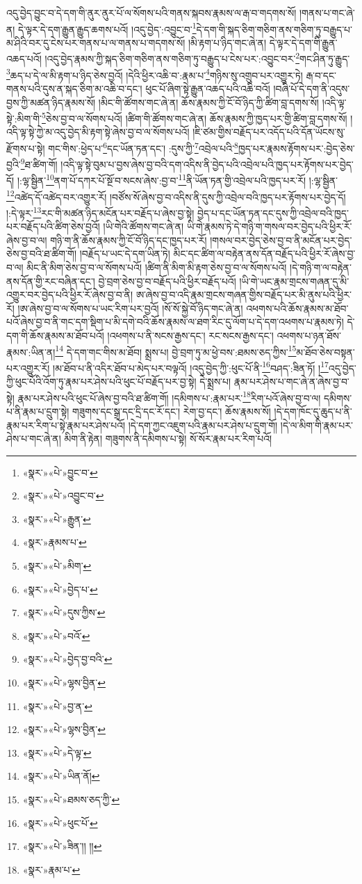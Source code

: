 འདུ་བྱེད་བྱུང་བ་དེ་དག་གི་ནུར་ནུར་པོ་ལ་སོགས་པའི་གནས་སྐབས་རྣམས་ལ་རྒ་བ་གདགས་སོ། །གནས་པ་གང་ཞེ་ན། དེ་ལྟར་དེ་དག་རྒྱུན་རྒྱུད་ཆགས་པའོ། །འདུ་བྱེད་:འབྱུང་བ་\footnote{«སྣར་»«པེ་»བྱུང་བ་}དེ་དག་གི་སྐད་ཅིག་གཅིག་ནས་གཅིག་ཏུ་བརྒྱུད་པ་མ་ཤིའི་བར་དུ་ངེས་པར་གནས་པ་ལ་གནས་པ་གདགས་སོ། །མི་རྟག་པ་ཉིད་གང་ཞེ་ན། དེ་ལྟར་དེ་དག་གི་རྒྱུན་འཆད་པའོ། །འདུ་བྱེད་རྣམས་ཀྱི་སྐད་ཅིག་གཅིག་ནས་གཅིག་ཏུ་བརྒྱུད་པ་ངེས་པར་:འབྱུང་བར་\footnote{«སྣར་»«པེ་»འབྱུང་བ་}གང་ཤིན་ཏུ་རྒྱུད་\footnote{«སྣར་»«པེ་»རྒྱུན་}ཆད་པ་དེ་ལ་མི་རྟག་པ་ཉིད་ཅེས་བྱའོ། །དེའི་ཕྱིར་འཆི་བ་:རྣམ་པ་\footnote{«སྣར་»རྣམས་པ་}གཉིས་སུ་འགྲུབ་པར་འགྱུར་ཏེ། རྒ་བ་དང་གནས་པའི་དུས་ན་སྐད་ཅིག་མ་འཆི་བ་དང་། ཕུང་པོ་ཞིག་སྟེ་རྒྱུན་འཆད་པའི་འཆི་བའོ། །བཞི་པོ་དེ་དག་ནི་འདུས་བྱས་ཀྱི་མཚན་ཉིད་རྣམས་སོ། །མིང་གི་ཚོགས་གང་ཞེ་ན། ཆོས་རྣམས་ཀྱི་ངོ་བོ་ཉིད་ཀྱི་ཚིག་བླ་དགས་སོ། །འདི་ལྟ་སྟེ་:མིག་གི་\footnote{«སྣར་»«པེ་»མིག་}ཅེས་བྱ་བ་ལ་སོགས་པའོ། །ཚིག་གི་ཚོགས་གང་ཞེ་ན། ཆོས་རྣམས་ཀྱི་ཁྱད་པར་གྱི་ཚིག་བླ་དགས་སོ། །འདི་ལྟ་སྟེ་ཀྱེ་མ་འདུ་བྱེད་མི་རྟག་སྟེ་ཞེས་བྱ་བ་ལ་སོགས་པའོ། །ཇི་ཙམ་གྱིས་བརྗོད་པར་འདོད་པའི་དོན་ཡོངས་སུ་རྫོགས་པ་སྟེ། གང་གིས་:ཕྱེད་པ་\footnote{«སྣར་»«པེ་»བྱེད་པ་}དང་ཡོན་ཏན་དང་། :དུས་ཀྱི་\footnote{«སྣར་»«པེ་»དུས་ཀྱིས་}འབྲེལ་པའི་\footnote{«སྣར་»«པེ་»བའོ་}ཁྱད་པར་རྣམས་རྟོགས་པར་:བྱེད་ཅེས་བྱའི་\footnote{«སྣར་»«པེ་»བྱེད་བྱ་བའི་}ཐ་ཚིག་གོ། །འདི་ལྟ་སྟེ་བུམ་པ་བྱས་ཞེས་བྱ་བའི་དག་འདིས་ནི་བྱེད་པའི་འབྲེལ་པའི་ཁྱད་པར་རྟོགས་པར་བྱེད་དོ། །:ལྷ་སྦྱིན་\footnote{«སྣར་»«པེ་»ལྷས་བྱིན་}ནག་པོ་དཀར་པོ་སྔོ་བ་སངས་ཞེས་:བྱ་བ་\footnote{«སྣར་»«པེ་»བྱ་ན་}ནི་ཡོན་ཏན་གྱི་འབྲེལ་པའི་ཁྱད་པར་རོ། །:ལྷ་སྦྱིན་\footnote{«སྣར་»«པེ་»ལྷས་བྱིན་}འཚེད་དོ་འཚེད་བར་འགྱུར་རོ། །བཙོས་སོ་ཞེས་བྱ་བ་འདིས་ནི་དུས་ཀྱི་འབྲེལ་བའི་ཁྱད་པར་རྟོགས་པར་བྱེད་དོ། །:དེ་ལྟར་\footnote{«སྣར་»«པེ་»དེ་ལྟ་}རང་གི་མཚན་ཉིད་མངོན་པར་བརྗོད་པ་ཞེས་བྱ་སྟེ། བྱེད་པ་དང་ཡོན་ཏན་དང་དུས་ཀྱི་འབྲེལ་བའི་ཁྱད་པར་བརྗོད་པའི་ཚིག་ཅེས་བྱའོ། །ཡི་གེའི་ཚོགས་གང་ཞེ་ན། ཡི་གེ་རྣམས་ཏེ་དེ་གཉི་ག་གསལ་བར་བྱེད་པའི་ཕྱིར་རོ་ཞེས་བྱ་བ་ལ། གཉི་ག་ནི་ཆོས་རྣམས་ཀྱི་ངོ་བོ་ཉིད་དང་ཁྱད་པར་རོ། །གསལ་བར་བྱེད་ཅེས་བྱ་བ་ནི་མངོན་པར་བྱེད་ཅེས་བྱ་བའི་ཐ་ཚིག་གོ། །བརྗོད་པ་ཡང་དེ་དག་ཡིན་ཏེ། མིང་དང་ཚིག་ལ་བརྟེན་ནས་དོན་བརྗོད་པའི་ཕྱིར་རོ་ཞེས་བྱ་བ་ལ། མིང་ནི་མིག་ཅེས་བྱ་བ་ལ་སོགས་པའོ། །ཚིག་ནི་མིག་མི་རྟག་ཅེས་བྱ་བ་ལ་སོགས་པའོ། །དེ་གཉི་ག་ལ་བརྟེན་ནས་དོན་གྱི་རང་བཞིན་དང་། བྱེ་བྲག་ཅེས་བྱ་བ་བརྗོད་པའི་ཕྱིར་བརྗོད་པའོ། །ཡི་གེ་ཡང་རྣམ་གྲངས་གཞན་དུ་མི་འགྱུར་བར་བྱེད་པའི་ཕྱིར་རོ་ཞེས་བྱ་བ་ནི། ཨ་ཞེས་བྱ་བ་འདི་རྣམ་གྲངས་གཞན་གྱིས་བརྗོད་པར་མི་ནུས་པའི་ཕྱིར་རོ། །ཨ་ཞེས་བྱ་བ་ལ་སོགས་པ་ཡང་རིག་པར་བྱའོ། །སོ་སོ་སྐྱེ་བོ་ཉིད་གང་ཞེ་ན། འཕགས་པའི་ཆོས་རྣམས་མ་ཐོབ་པའོ་ཞེས་བྱ་བ་ནི་གང་དག་སྡིག་པ་མི་དགེ་བའི་ཆོས་རྣམས་ལ་ཐག་རིང་དུ་ལོག་པ་དེ་དག་འཕགས་པ་རྣམས་ཏེ། དེ་དག་གི་ཆོས་རྣམས་མ་ཐོབ་པའོ། །འཕགས་པ་ནི་སངས་རྒྱས་དང་། རང་སངས་རྒྱས་དང་། འཕགས་པ་ཉན་ཐོས་རྣམས་:ཡིན་ན།\footnote{«སྣར་»«པེ་»ཡིན་ནོ།} དེ་དག་གང་གིས་མ་ཐོབ། སྨྲས་པ། བྱེ་བྲག་ཏུ་མ་ཕྱེ་བས་:ཐམས་ཅད་ཀྱིས་\footnote{«སྣར་»«པེ་»ཐམས་ཅད་ཀྱི་}མ་ཐོབ་ཅེས་བསྟན་པར་འགྱུར་རོ། །མ་ཐོབ་པ་ནི་འདིར་ཐོབ་པ་མེད་པར་བལྟའོ། །འདུ་བྱེད་ཀྱི་:ཕུང་པོ་ནི་\footnote{«སྣར་»«པེ་»ཕུང་པོ་}བཤད་:ཟིན་ཏོ། །\footnote{«སྣར་»«པེ་»ཟིན་།། །།}འདུ་བྱེད་ཀྱི་ཕུང་པོའི་འོག་ཏུ་རྣམ་པར་ཤེས་པའི་ཕུང་པོ་བརྗོད་པར་བྱ་སྟེ། དེ་སྨྲས་པ། རྣམ་པར་ཤེས་པ་གང་ཞེ་ན་ཞེས་བྱ་བ་སྟེ། རྣམ་པར་ཤེས་པའི་ཕུང་པོ་ཞེས་བྱ་བའི་ཐ་ཚིག་གོ། །དམིགས་པ་:རྣམ་པར་\footnote{«སྣར་»རྣམ་པ་}རིག་པའོ་ཞེས་བྱ་བ་ལ། དམིགས་པ་ནི་རྣམ་པ་དྲུག་སྟེ། གཟུགས་དང་སྒྲ་དང་དྲི་དང་རོ་དང་། རེག་བྱ་དང་། ཆོས་རྣམས་སོ། །དེ་དག་ཁོང་དུ་ཆུད་པ་ནི་རྣམ་པར་རིག་པ་སྟེ་རྣམ་པར་ཤེས་པའོ། །དེ་དག་ཀྱང་འཇུག་པའི་རྣམ་པར་ཤེས་པ་དྲུག་གོ། །དེ་ལ་མིག་གི་རྣམ་པར་ཤེས་པ་གང་ཞེ་ན། མིག་ནི་རྟེན། གཟུགས་ནི་དམིགས་པ་སྟེ། སོ་སོར་རྣམ་པར་རིག་པའོ། 